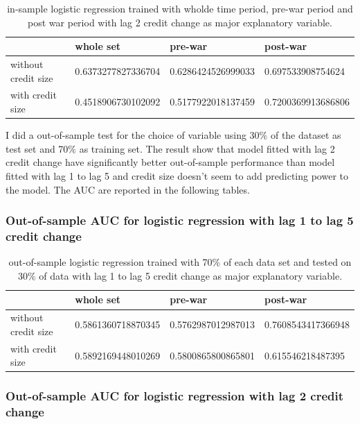 \documentclass{article}
\begin{document}
\begin{table}[H]
    \caption{in-sample logistic regression trained with wholde time period,
    pre-war period and post war period with lag 2 credit change as major
    explanatory variable.}
    \begin{tabular}{|l|l|l|l|}
    \hline
                        & whole set          & pre-war            & post-war           \\ \hline
    without credit size & 0.6373277827336704 & 0.6286424526999033 & 0.697533908754624  \\ \hline
    with credit size    & 0.4518906730102092 & 0.5177922018137459 & 0.7200369913686806 \\ \hline
    \end{tabular}
\end{table}

I did a out-of-sample test for the choice of variable using
30\% of the dataset as test set and 70\% as training set.
The result show that model fitted with lag 2 credit change have
significantly better out-of-sample performance than model fitted with
lag 1 to lag 5 and credit size doesn't seem to add predicting
power to the model. The AUC are reported in the following tables.

\subsubsection*{Out-of-sample AUC for logistic regression with lag 1 to lag 5 credit change}

\begin{table}[H]
    \caption{out-of-sample logistic regression trained with 70\% of
    each data set and tested on 30\% of data with lag 1 to lag 5
    credit change as major explanatory variable.}
    \begin{tabular}{|l|l|l|l|}
    \hline
                        & whole set          & pre-war            & post-war           \\ \hline
    without credit size & 0.5861360718870345 & 0.5762987012987013 & 0.7608543417366948 \\ \hline
    with credit size    & 0.5892169448010269 & 0.5800865800865801 & 0.615546218487395  \\ \hline
    \end{tabular}
\end{table}


\subsubsection*{Out-of-sample AUC for logistic regression with lag 2 credit change}
\end{document}

